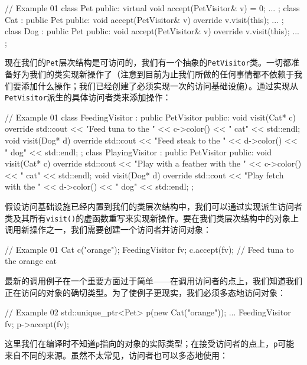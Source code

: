 \begin{code}
// Example 01
class Pet {
  public:
  virtual void accept(PetVisitor& v) = 0;
  ...
};
class Cat : public Pet {
  public:
  void accept(PetVisitor& v) override { v.visit(this); }
  ...
};
class Dog : public Pet {
  public:
  void accept(PetVisitor& v) override { v.visit(this); }
  ...
};
\end{code}

现在我们的\texttt{Pet}层次结构是可访问的，我们有一个抽象的\texttt{PetVisitor}类。一切都准备好为我们的类实现新操作了（注意到目前为止我们所做的任何事情都不依赖于我们要添加什么操作；我们已经创建了必须实现一次的访问基础设施）。通过实现从\texttt{PetVisitor}派生的具体访问者类来添加操作：

\begin{code}
// Example 01
class FeedingVisitor : public PetVisitor {
  public:
  void visit(Cat* c) override {
    std::cout << "Feed tuna to the " << c->color()
              << " cat" << std::endl;
  }
  void visit(Dog* d) override {
    std::cout << "Feed steak to the " << d->color()
              << " dog" << std::endl;
  }
};
class PlayingVisitor : public PetVisitor {
  public:
  void visit(Cat* c) override {
    std::cout << "Play with a feather with the "
              << c->color() << " cat" << std::endl;
  }
  void visit(Dog* d) override {
    std::cout << "Play fetch with the " << d->color()
              << " dog" << std::endl;
  }
};
\end{code}

假设访问基础设施已经内置到我们的类层次结构中，我们可以通过实现派生访问者类及其所有\texttt{visit()}的虚函数重写来实现新操作。要在我们类层次结构中的对象上调用新操作之一，我们需要创建一个访问者并访问对象：

\begin{code}
// Example 01
Cat c("orange");
FeedingVisitor fv;
c.accept(fv); // Feed tuna to the orange cat
\end{code}

最新的调用例子在一个重要方面过于简单——在调用访问者的点上，我们知道我们正在访问的对象的确切类型。为了使例子更现实，我们必须多态地访问对象：

\begin{code}
// Example 02
std::unique_ptr<Pet> p(new Cat("orange"));
...
FeedingVisitor fv;
p->accept(fv);
\end{code}

这里我们在编译时不知道\texttt{p}指向的对象的实际类型；在接受访问者的点上，\texttt{p}可能来自不同的来源。虽然不太常见，访问者也可以多态地使用：


